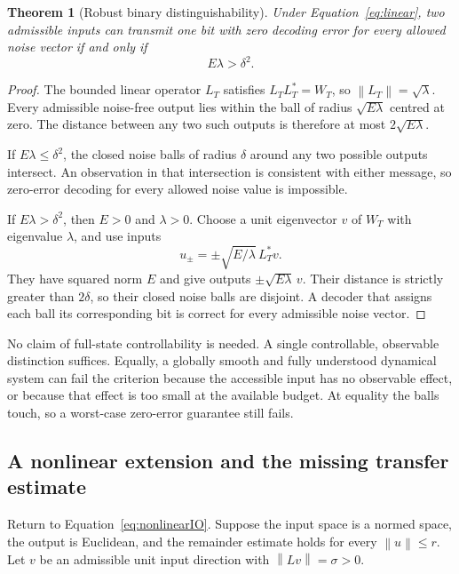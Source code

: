 \documentclass[11pt,a4paper]{article}
\newtheorem{theorem}{Theorem}[section]
\theoremstyle{definition}
\theoremstyle{remark}
\newcommand{\norm}[1]{\left\lVert#1\right\rVert}
\begin{document}
\begin{theorem}[Robust binary distinguishability]\label{thm:bit}
Under Equation~\eqref{eq:linear}, two admissible inputs can transmit one bit with zero decoding error for every allowed noise vector if and only if
\begin{equation}\label{eq:bitcriterion}
 E\lambda>\delta^2.
\end{equation}
\end{theorem}
\begin{proof}
The bounded linear operator $L_T$ satisfies $L_TL_T^*=W_T$, so $\norm{L_T}=\sqrt{\lambda}$. Every admissible noise-free output lies within the ball of radius $\sqrt{E\lambda}$ centred at zero. The distance between any two such outputs is therefore at most $2\sqrt{E\lambda}$.

If $E\lambda\leq\delta^2$, the closed noise balls of radius $\delta$ around any two possible outputs intersect. An observation in that intersection is consistent with either message, so zero-error decoding for every allowed noise value is impossible.

If $E\lambda>\delta^2$, then $E>0$ and $\lambda>0$. Choose a unit eigenvector $v$ of $W_T$ with eigenvalue $\lambda$, and use inputs
\[
 u_\pm=\pm\sqrt{E/\lambda}\,L_T^*v.
\]
They have squared norm $E$ and give outputs $\pm\sqrt{E\lambda}\,v$. Their distance is strictly greater than $2\delta$, so their closed noise balls are disjoint. A decoder that assigns each ball its corresponding bit is correct for every admissible noise vector.
\end{proof}
No claim of full-state controllability is needed. A single controllable, observable distinction suffices. Equally, a globally smooth and fully understood dynamical system can fail the criterion because the accessible input has no observable effect, or because that effect is too small at the available budget. At equality the balls touch, so a worst-case zero-error guarantee still fails.

\subsection{A nonlinear extension and the missing transfer estimate}
Return to Equation~\eqref{eq:nonlinearIO}. Suppose the input space is a normed space, the output is Euclidean, and the remainder estimate holds for every $\norm{u}\leq r$. Let $v$ be an admissible unit input direction with $\norm{Lv}=\sigma>0$.
\end{document}
